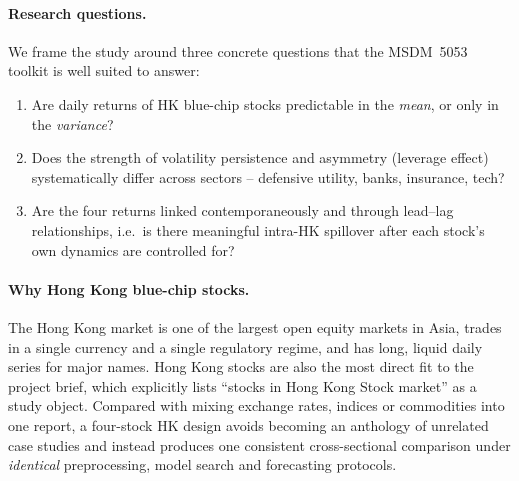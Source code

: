 \documentclass[11pt,a4paper]{article}
\begin{document}
\paragraph{Research questions.}
We frame the study around three concrete questions that the
MSDM~5053 toolkit is well suited to answer:
\begin{enumerate}[leftmargin=*]
  \item Are daily returns of HK blue-chip stocks predictable in the
        \emph{mean}, or only in the \emph{variance}?
  \item Does the strength of volatility persistence and asymmetry
        (leverage effect) systematically differ across sectors --
        defensive utility, banks, insurance, tech?
  \item Are the four returns linked contemporaneously and through
        lead--lag relationships, i.e.\ is there meaningful intra-HK
        spillover after each stock's own dynamics are controlled for?
\end{enumerate}

\paragraph{Why Hong Kong blue-chip stocks.}
The Hong Kong market is one of the largest open equity markets in
Asia, trades in a single currency and a single regulatory regime,
and has long, liquid daily series for major names.  Hong Kong stocks
are also the most direct fit to the project brief, which explicitly
lists ``stocks in Hong Kong Stock market'' as a study object.
Compared with mixing exchange rates, indices or commodities into one
report, a four-stock HK design avoids becoming an anthology of
unrelated case studies and instead produces one consistent
cross-sectional comparison under \emph{identical} preprocessing,
model search and forecasting protocols.
\end{document}
